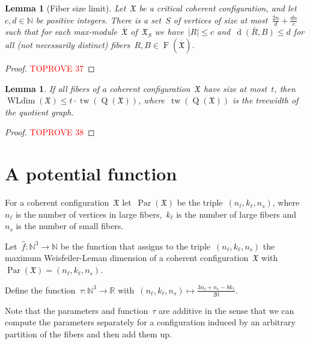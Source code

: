 \documentclass[english,a4paper]{article}
\theoremstyle{plain}
\newtheorem{lemma}      [theorem]{Lemma}
\theoremstyle{definition}
\newcommand{\Nat}{\ensuremath{\mathbb{N}}}
\newcommand{\Rel}{\ensuremath{\mathbb{R}}}
\newcommand{\abs}[1]{| #1 |}
\DeclareMathOperator{\Fibers}{F}
\newcommand{\coherentConfig}{\ensuremath{\mathfrak{X}}}
\newcommand{\fibers}[1]{\ensuremath{\Fibers \left( #1 \right)}}
\newcommand{\minimalDegree}[2]{\Deg(#1,#2)}
\DeclareMathOperator*{\WLdim}{WLdim}
\newcommand{\wldim}[1]{\ensuremath{\WLdim\left(#1\right)}}
\DeclareMathOperator*{\Quotient}{Q}
\newcommand{\quotientGraph}[1]{\ensuremath{\Quotient(#1)}}
\DeclareMathOperator{\Deg}{d}
\DeclareMathOperator{\treewidth}{tw}
\newcommand{\f}{f}
\DeclareMathOperator{\parameters}{Par}
\begin{document}
\begin{lemma}[Fiber size limit]
\label{lem:bound-on-cc-size}
    Let~$\coherentConfig$ be a critical coherent configuration, and let~$c, d \in \Nat$ be positive integers.
    There is a set~$S$ of vertices of size at most~$\frac{2n}{d} + \frac{dn}{c}$ such that for each max-module~$\overline{\coherentConfig}$ of~$\coherentConfig_S$ we have~$\abs{R} \leq c$ and~$\overline{\minimalDegree{R}{B}}\leq d$
     for all (not necessarily distinct) fibers~$R,B \in \fibers{\overline{\coherentConfig}}$.
\end{lemma}
\begin{proof}\textcolor{red}{TOPROVE 37}\end{proof}


\begin{lemma}
\label{lem:bd:tw:and:fibre:size:bd:WL}
    If all fibers of a coherent configuration~$\coherentConfig$ have size at most~$t$, then~$\wldim{\coherentConfig}\leq t\cdot \treewidth(\quotientGraph{\coherentConfig})$, where~$\treewidth(\quotientGraph{\coherentConfig})$ is the treewidth of the quotient graph.
\end{lemma}
\begin{proof}\textcolor{red}{TOPROVE 38}\end{proof}
 

\section{A potential function}
\label{sec:potential:func}


For a coherent configuration~$\coherentConfig$ let~$\parameters(\coherentConfig)$ be the triple~$(n_\ell, k_\ell,n_s)$, where~$n_\ell$ is the number of vertices in large fibers,~$k_\ell$ is the number of large fibers and~$n_s$ is the number of small fibers.

Let~$\widehat{\f} \colon \Nat^3 \longrightarrow \Nat$ be the function that assigns to the triple~$(n_\ell, k_\ell,n_s)$ the maximum Weisfeiler-Leman dimension of a coherent configuration~$\coherentConfig$ with~$\parameters(\coherentConfig)=(n_\ell, k_\ell,n_s)$.

Define the function~$\tau \colon \Nat^3 \rightarrow \Rel$ with~$(n_\ell, k_\ell, n_s) \mapsto \frac{3n_\ell + n_s - 8k_\ell}{20}$.

Note that the parameters and function~$\tau$ are additive in the sense that we can compute the parameters separately for a configuration induced by an arbitrary partition of the fibers and then add them up.
\end{document}
